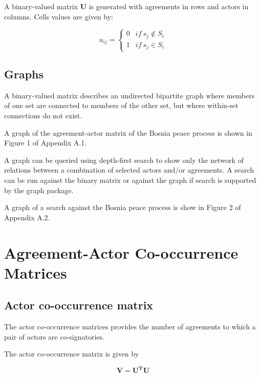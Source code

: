 \documentclass{article}
\begin{document}
A binary-valued matrix $\bm{U}$ is generated with agreements in rows and actors in columns. Cells values are given by:

\begin{equation}
u_{ij} =
\begin{cases}
0& if \ s_j \notin S_{i}\\
1 & if \ s_j \in S_{i}
\end{cases}
\end{equation}


\subsection{Graphs}

A binary-valued matrix describes an undirected bipartite graph where members of one set are connected to members of the other set, but where within-set connections do not exist. \newline

A graph of the agreement-actor matrix of the Bosnia peace process is shown in Figure 1 of Appendix A.1.\newline

A graph can be queried using depth-first search to show only the network of relations between a combination of selected actors and/or agreements. A search can be run against the binary matrix or against the graph if search is supported by the graph package. \newline

A graph of a search against the Bosnia peace process is show in Figure 2 of Appendix A.2.\newline

\section{Agreement-Actor Co-occurrence Matrices}

\subsection{Actor co-occurrence matrix}

The actor co-occurrence matrices provides the number of agreements to which a pair of actors are co-signatories.\newline

The actor co-occurrence matrix is given by

\begin{equation}
\bm{V = U^TU}
\end{equation}
\end{document}
